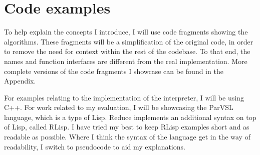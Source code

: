 \section{Code examples}

To help explain the concepts I introduce, I will use code fragments showing the algorithms.
These fragments will be a simplification of the original code, in order to remove the need
for context within the rest of the codebase. To that end, the names and function interfaces
are different from the real implementation. More complete versions of the code fragments
I showcase can be found in the Appendix.

For examples relating to the implementation of the interpreter, I will be using C++.
For work related to my evaluation, I will be showcasing the ParVSL language, which is a type
of Lisp. Reduce implements an additional syntax on top of Lisp, called RLisp.
I have tried my best to keep RLisp examples short and as readable
as possible. Where I think the syntax of the language get in the way of readability, I
switch to pseudocode to aid my explanations.
